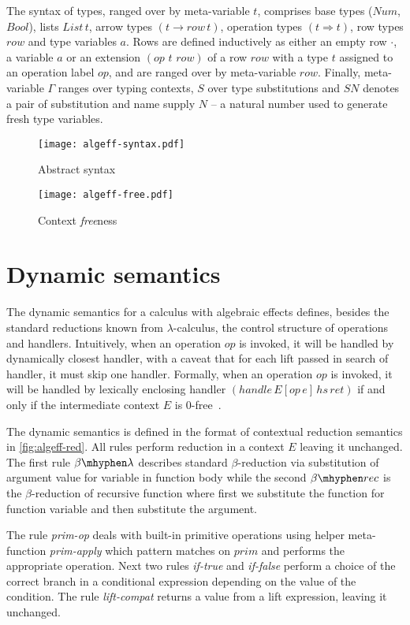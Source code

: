 \documentclass[inz, english, longabstract]{iithesis}
\newcommand{\LC}{\(\lambda\)-calculus}
\begin{document}
The syntax of types, ranged over by meta-variable $ t $, comprises base types ($Num$, $Bool$), lists $List \, t$, arrow types $(t \rightarrow row \, t)$, operation types $(t \Rightarrow t)$, row types $row$ and type variables $ a $.
Rows are defined inductively as either an empty row $\cdot$, a variable $ a $ or an extension $(op \,\, t \,\, row)$ of a row $row$ with a type $t$ assigned to an operation label $op$, and are ranged over by meta-variable $row$.
Finally, meta-variable $\Gamma$ ranges over typing contexts, $S$ over type substitutions and $SN$ denotes a pair of substitution and name supply $N$ -- a natural number used to generate fresh type variables.

\begin{figure}
  \centering
  \texttt{[image: algeff-syntax.pdf]}
  \caption{Abstract syntax}
  \label{fig:algeff-syntax}
\end{figure}

\begin{figure}
  \centering
  \texttt{[image: algeff-free.pdf]}
  \caption{Context \emph{free}ness}
  \label{fig:algeff-free}  
\end{figure}

\section{Dynamic semantics}
The dynamic semantics for a calculus with algebraic effects defines, besides the standard reductions known from \LC{}, the control structure of operations and handlers.
Intuitively, when an operation $op$ is invoked, it will be handled by dynamically closest handler, with a caveat that for each lift passed in search of handler, it must skip one handler.
Formally, when an operation $ op $ is invoked, it will be handled by lexically enclosing handler $ (handle \, E[op \, e] \, hs \, ret) $ if and only if the intermediate context $ E $ is $0$-free~\cite{Biernacki2017}.

The dynamic semantics is defined in the format of contextual reduction semantics in \autoref{fig:algeff-red}.
All rules perform reduction in a context $ E $ leaving it unchanged.
The first rule $\beta\mhyphen\lambda$ describes standard $ \beta $-reduction via substitution of argument value for variable in function body while the second $\beta\mhyphen rec$ is the $ \beta $-reduction of recursive function where first we substitute the function for function variable and then substitute the argument.

The rule \emph{prim-op} deals with built-in primitive operations using helper meta-function \textit{prim-apply} which pattern matches on $prim$ and performs the appropriate operation.
Next two rules \emph{if-true} and \emph{if-false} perform a choice of the correct branch in a conditional expression depending on the value of the condition.
The rule \emph{lift-compat} returns a value from a lift expression, leaving it unchanged.
\end{document}
